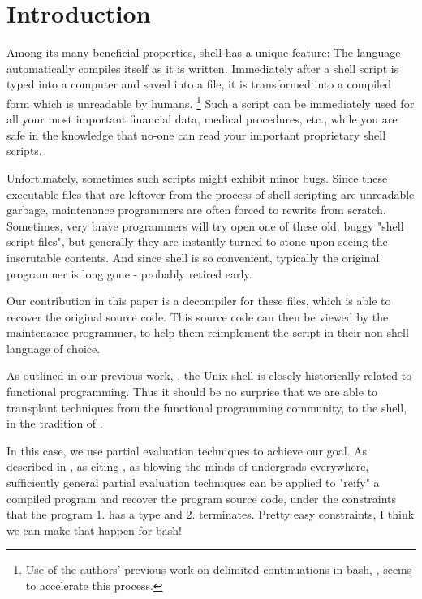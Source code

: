 \documentclass[sigplan]{acmart}
\begin{document}

\maketitle

\section{Introduction}\label{introduction}
Among its many beneficial properties, shell has a unique feature:
The language automatically compiles itself as it is written.
Immediately after a shell script is typed into a computer and saved into a file,
it is transformed into a compiled form which is unreadable by humans.
\footnote{Use of the authors' previous work on delimited continuations in bash, \cite{bashcc}, seems to accelerate this process.}
Such a script can be immediately used for all your most important financial data, medical procedures, etc.,
while you are safe in the knowledge that no-one can read your important proprietary shell scripts.

Unfortunately, sometimes such scripts might exhibit minor bugs.
Since these executable files that are leftover from the process of shell scripting are unreadable garbage,
maintenance programmers are often forced to rewrite from scratch.
Sometimes, very brave programmers will try open one of these old, buggy "shell script files",
but generally they are instantly turned to stone upon seeing the inscrutable contents.
And since shell is so convenient, typically the original programmer is long gone - probably retired early.

Our contribution in this paper is a decompiler for these files,
which is able to recover the original source code.
This source code can then be viewed by the maintenance programmer,
to help them reimplement the script in their non-shell language of choice.

As outlined in our previous work, \cite{bashcc},
the Unix shell is closely historically related to functional programming.
Thus it should be no surprise that we are able to transplant techniques
from the functional programming community, to the shell,
in the tradition of \cite{frankenstein}.

In this case, we use partial evaluation techniques to achieve our goal.
As described in \cite{oleg}, as citing \cite{danvy}, as blowing the minds of undergrads everywhere,
sufficiently general partial evaluation techniques
can be applied to "reify" a compiled program and recover the program source code,
under the constraints that the program 1. has a type and 2. terminates.
Pretty easy constraints, I think we can make that happen for bash!
\end{document}
